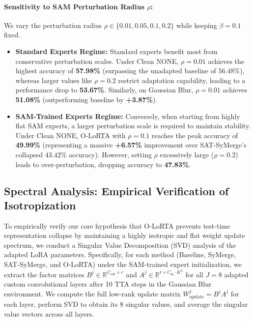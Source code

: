 \documentclass{article}
\theoremstyle{plain}
\theoremstyle{definition}
\theoremstyle{remark}
\begin{document}
\paragraph{Sensitivity to SAM Perturbation Radius $\rho$:}
We vary the perturbation radius $\rho \in \{0.01, 0.05, 0.1, 0.2\}$ while keeping $\beta = 0.1$ fixed.
\begin{itemize}
    \item \textbf{Standard Experts Regime:} Standard experts benefit most from conservative perturbation scales. Under Clean NONE, $\rho = 0.01$ achieves the highest accuracy of \textbf{57.98\%} (surpassing the unadapted baseline of $56.48\%$), whereas larger values like $\rho = 0.2$ restrict adaptation capability, leading to a performance drop to \textbf{53.67\%}. Similarly, on Gaussian Blur, $\rho = 0.01$ achieves \textbf{51.08\%} (outperforming baseline by \textbf{+3.87\%}).
    \item \textbf{SAM-Trained Experts Regime:} Conversely, when starting from highly flat SAM experts, a larger perturbation scale is required to maintain stability. Under Clean NONE, O-LoRTA with $\rho = 0.1$ reaches the peak accuracy of \textbf{49.99\%} (representing a massive \textbf{+6.57\%} improvement over SAT-SyMerge's collapsed $43.42\%$ accuracy). However, setting $\rho$ excessively large ($\rho = 0.2$) leads to over-perturbation, dropping accuracy to \textbf{47.83\%}.
\end{itemize}

\subsection{Spectral Analysis: Empirical Verification of Isotropization}
To empirically verify our core hypothesis that O-LoRTA prevents test-time representation collapse by maintaining a highly isotropic and flat weight update spectrum, we conduct a Singular Value Decomposition (SVD) analysis of the adapted LoRA parameters. Specifically, for each method (Baseline, SyMerge, SAT-SyMerge, and O-LoRTA) under the SAM-trained expert initialization, we extract the factor matrices $B^j \in \mathbb{R}^{C_{\text{out}} \times r}$ and $A^j \in \mathbb{R}^{r \times C_{\text{in}} \cdot K^2}$ for all $J=8$ adapted custom convolutional layers after 10 TTA steps in the Gaussian Blur environment. We compute the full low-rank update matrix $W^j_{\text{update}} = B^j A^j$ for each layer, perform SVD to obtain its 8 singular values, and average the singular value vectors across all layers.
\end{document}
